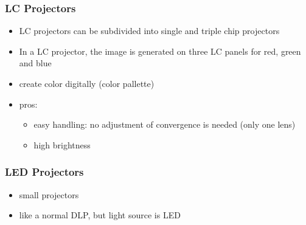 \documentclass{standalone}
\begin{document}
\subsubsection*{LC Projectors}
\begin{itemize}
\item LC projectors can be subdivided into single and triple chip projectors
\item In a LC projector, the image is generated on three LC panels for red, green and blue
\item create color digitally (color pallette)
\item pros:
	\begin{itemize}
		\item easy handling: no adjustment of convergence is needed (only one lens)
		\item high brightness
	\end{itemize}
\end{itemize}

\subsubsection*{LED Projectors}
\begin{itemize}
\item small projectors
\item like a normal DLP, but light source is LED

\end{itemize}
\end{document}
